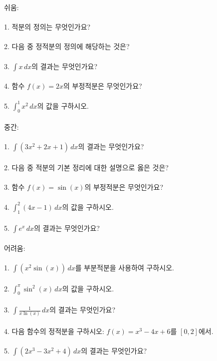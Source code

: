 \documentclass[fleqn]{article}
\begin{document}
      
        쉬움: \\\\  
1. 적분의 정의는 무엇인가요? \\\\  
2. 다음 중 정적분의 정의에 해당하는 것은? \\\\  
3. \( \int x \, dx \)의 결과는 무엇인가요? \\\\  
4. 함수 \( f(x) = 2x \)의 부정적분은 무엇인가요? \\\\  
5. \( \int_0^1 x^2 \, dx \)의 값을 구하시오. \\\\

중간: \\\\  
1. \( \int (3x^2 + 2x + 1) \, dx \)의 결과는 무엇인가요? \\\\  
2. 다음 중 적분의 기본 정리에 대한 설명으로 옳은 것은? \\\\  
3. 함수 \( f(x) = \sin(x) \)의 부정적분은 무엇인가요? \\\\  
4. \( \int_1^2 (4x - 1) \, dx \)의 값을 구하시오. \\\\  
5. \( \int e^x \, dx \)의 결과는 무엇인가요? \\\\

어려움: \\\\  
1. \( \int (x^2 \sin(x)) \, dx \)를 부분적분을 사용하여 구하시오. \\\\  
2. \( \int_0^{\pi} \sin^2(x) \, dx \)의 값을 구하시오. \\\\  
3. \( \int \frac{1}{x \ln(x)} \, dx \)의 결과는 무엇인가요? \\\\  
4. 다음 함수의 정적분을 구하시오: \( f(x) = x^3 - 4x + 6 \)를 \( [0, 2] \)에서. \\\\  
5. \( \int (2x^3 - 3x^2 + 4) \, dx \)의 결과는 무엇인가요? \\\\

      
        
\end{document}
